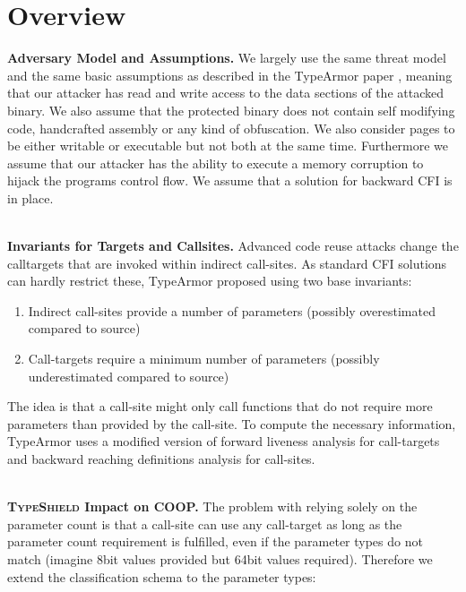 \section{Overview}
\label{chapter:TypeShild Overview}

\textbf{Adversary Model and Assumptions.}
\label{Adversary Model}
We largely use the same threat model and the same basic assumptions as described in the TypeArmor 
paper \cite{veen:typearmor}, meaning that our attacker has read and write access to the data 
sections of the attacked binary.  We also assume that the protected binary does not contain 
self modifying code, handcrafted assembly or any kind of obfuscation. We also consider pages 
to be either writable or executable but not both at the same time. Furthermore we assume 
that our attacker has the ability to execute a memory corruption to hijack the programs 
control flow. We assume that a solution for backward CFI is in place.

~\\
\textbf{Invariants for Targets and Callsites.}
\label{Invariants for Targets and Callsites}
Advanced code reuse attacks change the calltargets that are invoked within indirect 
call-sites. As standard CFI solutions can hardly restrict these, TypeArmor proposed using two base invariants:

\begin{enumerate}
\item Indirect call-sites provide a number of parameters (possibly overestimated compared to source)
\item Call-targets require a minimum number of parameters (possibly underestimated compared to source)
\end{enumerate}
The idea is that a call-site might only call functions that do not require more parameters than provided by the call-site. To compute the necessary information, TypeArmor uses a modified version of forward liveness analysis for call-targets and backward reaching definitions analysis for call-sites.

~\\
\textbf{\textsc{TypeShield} Impact on COOP.}
\label{TypeShild Impact on COOP}
The problem with relying solely on the parameter count is that a call-site can use any call-target as long as the parameter count requirement is fulfilled, even if the parameter types do not match (imagine 8bit values provided but 64bit values required). Therefore we extend the classification schema to the parameter types:

